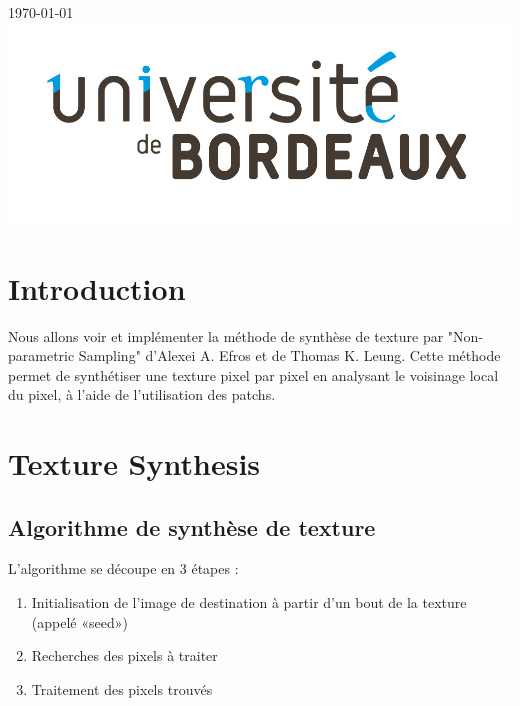 \begin{titlepage}

{\large \today}\\[2cm] %


\includegraphics[scale=0.25]{logo.jpg}\\ %
 

\vfill %

\end{titlepage}

\section{Introduction}
Nous allons voir et implémenter la méthode de synthèse de texture par "Non-parametric Sampling" d'Alexei A. Efros et de Thomas K. Leung.
Cette méthode permet de synthétiser une texture pixel par pixel en analysant le voisinage local du pixel, à l'aide de l'utilisation des patchs.

\section{Texture Synthesis}
\subsection{Algorithme de synthèse de texture}
L'algorithme se découpe en 3 étapes :
\begin{enumerate}
\item Initialisation de l’image de destination à partir d’un bout de la texture (appelé «seed»)
\item Recherches des pixels à traiter
\item Traitement des pixels trouvés
\end{enumerate}

